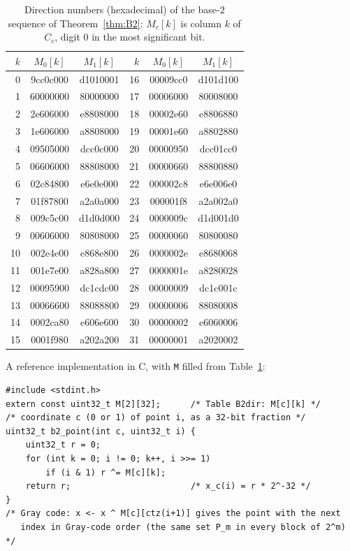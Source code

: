 \begin{table}[t]
\centering\small\ttfamily
\caption{Direction numbers (hexadecimal) of the base-$2$ sequence of Theorem~\ref{thm:B2}: $M_c[k]$ is column $k$ of $C_c$, digit $0$ in the most significant bit.}
\label{tab:B2dir}
\begin{tabular}{@{}r@{\quad}c@{\quad}c@{\qquad}r@{\quad}c@{\quad}c@{}}
\toprule
\rmfamily $k$ & \rmfamily $M_0[k]$ & \rmfamily $M_1[k]$ & \rmfamily $k$ & \rmfamily $M_0[k]$ & \rmfamily $M_1[k]$\\
\midrule
0 & 9cc0c000 & d1010001 & 16 & 00009cc0 & d101d100\\
1 & 60000000 & 80000000 & 17 & 00006000 & 80008000\\
2 & 2e606000 & e8808000 & 18 & 00002e60 & e8806880\\
3 & 1e606000 & a8808000 & 19 & 00001e60 & a8802880\\
4 & 09505000 & dcc0c000 & 20 & 00000950 & dcc01cc0\\
5 & 06606000 & 88808000 & 21 & 00000660 & 88800880\\
6 & 02c84800 & e6e0e000 & 22 & 000002c8 & e6e006e0\\
7 & 01f87800 & a2a0a000 & 23 & 000001f8 & a2a002a0\\
8 & 009c5c00 & d1d0d000 & 24 & 0000009c & d1d001d0\\
9 & 00606000 & 80808000 & 25 & 00000060 & 80800080\\
10 & 002e4e00 & e868e800 & 26 & 0000002e & e8680068\\
11 & 001e7e00 & a828a800 & 27 & 0000001e & a8280028\\
12 & 00095900 & dc1cdc00 & 28 & 00000009 & dc1c001c\\
13 & 00066600 & 88088800 & 29 & 00000006 & 88080008\\
14 & 0002ca80 & e606e600 & 30 & 00000002 & e6060006\\
15 & 0001f980 & a202a200 & 31 & 00000001 & a2020002\\
\bottomrule
\end{tabular}
\end{table}

A reference implementation in C, with \texttt{M} filled from Table~\ref{tab:B2dir}:
\begin{verbatim}
#include <stdint.h>
extern const uint32_t M[2][32];      /* Table B2dir: M[c][k] */
/* coordinate c (0 or 1) of point i, as a 32-bit fraction */
uint32_t b2_point(int c, uint32_t i) {
    uint32_t r = 0;
    for (int k = 0; i != 0; k++, i >>= 1)
        if (i & 1) r ^= M[c][k];
    return r;                        /* x_c(i) = r * 2^-32 */
}
/* Gray code: x <- x ^ M[c][ctz(i+1)] gives the point with the next
   index in Gray-code order (the same set P_m in every block of 2^m) */
\end{verbatim}

